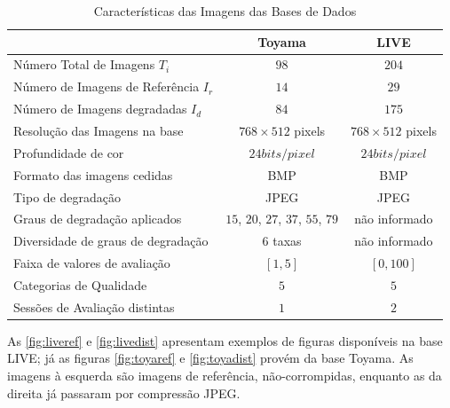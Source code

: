 \begin{table}[htb]
	\footnotesize
	\caption[Características das Imagens das Bases de Dados]{Características das Imagens das Bases de Dados}
	\label{tab:bds}
	\centering
 	\begin{tabular}{ l | c | c } %
							&	\textbf{Toyama}			&	\textbf{LIVE} 		\\\hline %
		Número Total de Imagens	$T_i$		&	$98$				&	$204$	  		\\ %
		Número de Imagens de Referência $I_r$	& 	$14$				&	$29$		  	\\
		Número de Imagens degradadas $I_d$	&	$84$				&	$175$	  		\\
		Resolução das Imagens na base		& 	$768 \times 512$ pixels 	&	$768 \times 512$ pixels	\\
		Profundidade de cor			&	$24bits/pixel$			&	$24bits/pixel$ 		\\
		Formato das imagens cedidas		&	BMP				&	BMP		  	\\
		Tipo de degradação			&	JPEG				&	JPEG		  	\\
		Graus de degradação aplicados		& $15$, $20$, $27$, $37$, $55$, $79$ 	& 	não informado 		\\
		Diversidade de graus de degradação	&	$6$ taxas			&  	não informado 		\\
		Faixa de valores de avaliação		& 	$[1, 5]$			& 	$[0, 100]$		\\
		Categorias de Qualidade			&	$5$				& 	$5$			\\
		Sessões de Avaliação distintas		&	$1$				& 	$2$			\\
		
	\end {tabular}\par
\end{table}

As \autoref{fig:liveref} e \autoref{fig:livedist} apresentam exemplos de figuras disponíveis na base LIVE; já as figuras \autoref{fig:toyaref} e \autoref{fig:toyadist} provém da base Toyama. As imagens à esquerda são imagens de referência, não-corrompidas, enquanto as da direita já passaram por compressão JPEG.

